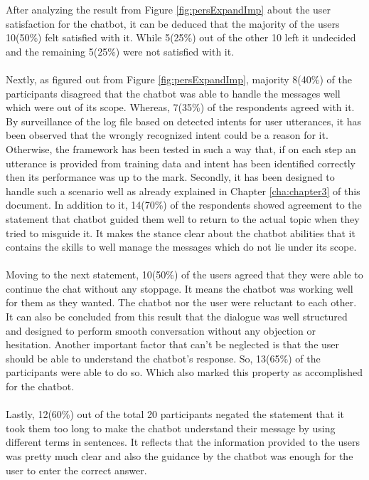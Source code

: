 After analyzing the result from Figure \ref{fig:persExpandImp} about the user satisfaction for the chatbot, it can be deduced that the majority of the users 10(50\%) felt satisfied with it. While 5(25\%) out of the other 10 left it undecided and the remaining 5(25\%) were not satisfied with it.
\\~\\
Nextly, as figured out from Figure \ref{fig:persExpandImp}, majority 8(40\%) of the participants disagreed that the chatbot was able to handle the messages well which were out of its scope. Whereas, 7(35\%) of the respondents agreed with it. By surveillance of the log file based on detected intents for user utterances, it has been observed that the wrongly recognized intent could be a reason for it. Otherwise, the framework has been tested in such a way that, if on each step an utterance is provided from training data and intent has been identified correctly then its performance was up to the mark. Secondly, it has been designed to handle such a scenario well as already explained in Chapter \ref{cha:chapter3} of this document. In addition to it, 14(70\%) of the respondents showed agreement to the statement that chatbot guided them well to return to the actual topic when they tried to misguide it. It makes the stance clear about the chatbot abilities that it contains the skills to well manage the messages which do not lie under its scope.
\\~\\
Moving to the next statement, 10(50\%) of the users agreed that they were able to continue the chat without any stoppage. It means the chatbot was working well for them as they wanted. The chatbot nor the user were reluctant to each other. It can also be concluded from this result that the dialogue was well structured and designed to perform smooth conversation without any objection or hesitation. Another important factor that can't be neglected is that the user should be able to understand the chatbot's response. So, 13(65\%) of the participants were able to do so. Which also marked this property as accomplished for the chatbot.
\\~\\
Lastly, 12(60\%) out of the total 20 participants negated the statement that it took them too long to make the chatbot understand their message by using different terms in sentences. It reflects that the information provided to the users was pretty much clear and also the guidance by the chatbot was enough for the user to enter the correct answer.


